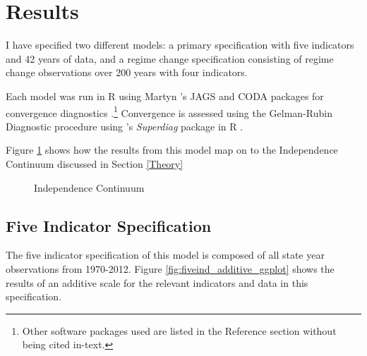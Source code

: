 \documentclass[12pt]{article}
\begin{document}
\section{Results}\label{Results}
I have specified two different models: a primary specification with five indicators and 42 years of data, and a regime change specification consisting of regime change observations over 200 years with four indicators.

Each model was run in R using Martyn \citeauthor{r-rjags}'s JAGS and CODA packages for convergence diagnostics \citep{R,r-CODA,r-rjags}.\footnote{Other software packages used are listed in the Reference section without being cited in-text.}  Convergence is assessed using the Gelman-Rubin Diagnostic procedure using \citeauthor{r-superdiag}'s \textit{Superdiag} package in R \citep{Gelman1992,R}.

\nocite{R,r-CODA,r-Foreign,r-R2jags,r-ggplot2,r-dplyr,r-rjagsr-doParallel,r-rcurl,r-random,r-superdiag,r-polycor}

Figure \ref{continuumresults} shows how the results from this model map on to the Independence Continuum discussed in Section \ref{Theory}

 \begin{figure}[tbh]\centering\caption{Independence Continuum}\label{continuumresults}
\end{figure}

\subsection{Five Indicator Specification}
The five indicator specification of this model is composed of all state year observations from 1970-2012.  Figure \ref{fig:fiveind_additive_ggplot} shows the results of an additive scale for the relevant indicators and data in this specification.  
\end{document}
